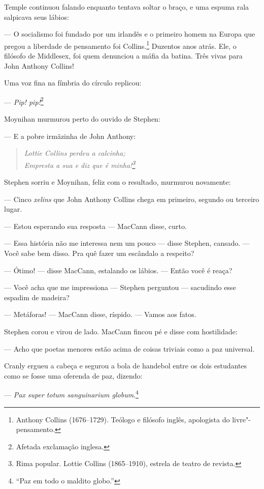 Temple continuou falando enquanto tentava soltar o braço, e uma espuma
rala salpicava seus lábios:

 --- O socialismo foi fundado por um irlandês e o primeiro homem na Europa que
pregou a liberdade de pensamento foi Collins.\footnote{ Anthony Collins
(1676--1729). Teólogo e filósofo inglês, apologista do livre"-pensamento.}  Duzentos
anos atrás.  Ele, o filósofo de Middlesex, foi quem denunciou a máfia da batina.
Três vivas para John Anthony Collins!

Uma voz fina na fímbria do círculo replicou:

 --- \textit{Pip! pip!}\footnote{ Afetada exclamação inglesa.}

Moynihan murmurou perto do ouvido de Stephen:

 --- E a pobre irmãzinha de John Anthony:

\begin{verse}\itshape
Lottie Collins perdeu a calcinha;\\
Empresta a sua e diz que é minha!\footnote{ Rima popular.
Lottie Collins (1865--1910), estrela de teatro de revista.}
\end{verse}

Stephen sorriu e Moynihan, feliz com o resultado, murmurou novamente:

 --- Cinco \textit{xelins} que John Anthony Collins chega em primeiro,
segundo ou terceiro lugar.

 --- Estou esperando sua resposta --- MacCann disse, curto.

 --- Essa história não me interessa nem um pouco --- disse Stephen, cansado.
 --- Você sabe bem disso. Pra quê fazer um escândalo a respeito?

 --- Ótimo! --- disse MacCann, estalando os lábios. --- Então você é reaça?

 --- Você acha que me impressiona --- Stephen perguntou --- sacudindo esse
espadim de madeira?

 --- Metáforas! --- MacCann disse, ríspido. --- Vamos aos fatos.

Stephen corou e virou de lado. MacCann fincou pé e disse com
hostilidade:

 --- Acho que poetas menores estão acima de coisas triviais como a paz
universal.

Cranly ergueu a cabeça e segurou a bola de handebol entre os
dois estudantes como se fosse uma oferenda de paz, dizendo:

 --- \textit{Pax super totum sanguinarium globum}.\footnote{ “Paz em todo o
maldito globo.”}

